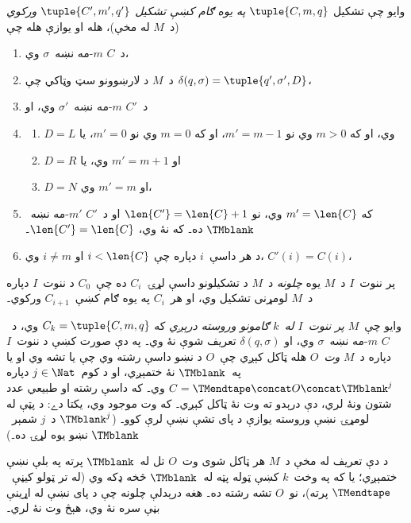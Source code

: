 \documentclass[../../../include/open-logic-section]{subfiles}
\begin{document}
\begin{defn}
وايو چې تشکيل $\tuple{C, m, q}$ \emph{په يوه ګام کښې تشکيل
$\tuple{C', m', q'}$ ورکوي} (د~$M$ له مخې)، هله او يوازې هله چې
\begin{enumerate}
\item د~$C$ $m$-مه نښه~$\sigma$ وي،
\item د~$M$ د لارښوونو سټ وټاکي چې $\delta(q, \sigma) =
  \tuple{q', \sigma', D}$،
\item د~$C'$ $m$-مه نښه~$\sigma'$ وي، او
\item
\begin{enumerate}
\item $D = L$ وي، او که $m>0$ وي نو $m' = m - 1$، او که $m=0$ وي نو $m'=0$، يا
\item $D = R$ او $m' = m + 1$ وي، يا
\item $D = N$ او $m' = m$ وي،
\end{enumerate}
\item که $m' = \len{C}$ وي، نو $\len{C'} = \len{C} + 1$ او د~$C'$
  $m'$-مه نښه~$\TMblank$ ده۔ که نۀ وي، $\len{C'}=\len{C}$۔
\item د هر داسې~$i$ دپاره چې $i < \len{C}$ او $i \neq m$ وي، $C'(i) = C(i)$،
\end{enumerate}
\end{defn}

\begin{defn}
پر ننوت~$I$ د~$M$ يوه \emph{چلونه} د~$M$ د تشکيلونو داسې لړۍ~$C_i$
ده چې~$C_0$ د ننوت~$I$ دپاره د~$M$ لومړنی تشکيل وي، او هر~$C_i$ په
يوه ګام کښې~$C_{i+1}$ ورکوي۔

وايو چې~$M$ \emph{پر ننوت~$I$ له~$k$ ګامونو وروسته درېږي} که $C_k =
\tuple{C, m, q}$ وي، د~$C$ $m$-مه نښه~$\sigma$ وي، او $\delta(q,
\sigma)$ تعريف شوې نۀ وي۔ په دې صورت کښې د ننوت~$I$ دپاره د~$M$
\emph{وت}~$O$ هله ټاکل کېږي چې~$O$ د نښو داسې رشته وي چې
يا تشه وي او يا په~$\TMblank$ نۀ ختمېږي، او د کوم~$j \in \Nat$ دپاره $C =
\TMendtape \concat O \concat \TMblank^j$ وي۔ که داسې رشته او طبيعي
عدد شتون ونۀ لري، دې درېدو ته وت نۀ ټاکل کېږي۔ که وت موجود وي، يکتا دے: د پټې له لومړۍ نښې وروسته يوازې د پای تشې نښې لرې کوو۔ ($\TMblank^j$ د~$j$
شمېر~$\TMblank$ نښو يوه لړۍ ده۔)
\end{defn}

\begin{explain}
د دې تعريف له مخې د~$M$ هر ټاکل شوی وت~$O$ تل له~$\TMblank$ پرته په
بلې نښې ختمېږي؛ يا که په وخت~$k$ کښې ټوله پټه له~$\TMblank$ څخه ډکه
وي (له تر ټولو کيڼې~$\TMendtape$ پرته)، نو~$O$ تشه رشته ده۔ هغه
درېدلې چلونه چې د پای نښې له اړينې بڼې سره نۀ وي، هېڅ وت نۀ لري۔
\end{explain}
\end{document}
